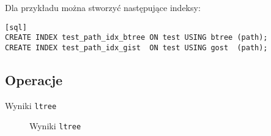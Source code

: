 Dla przykładu można stworzyć następujące indeksy:
\begin{verbatim}[sql]
CREATE INDEX test_path_idx_btree ON test USING btree (path);
CREATE INDEX test_path_idx_gist  ON test USING gost  (path);
\end{verbatim}



\subsection*{Operacje}











\begin{table}[h!]
  \caption{Wyniki \texttt{ltree}}
  \begin{center}
  \end{center}
\end{table}

\begin{figure}[h!t]
  \caption{Wyniki \texttt{ltree}}
  \label{fig:img_chart_simple}
  \begin{center}
  \end{center}
\end{figure}






